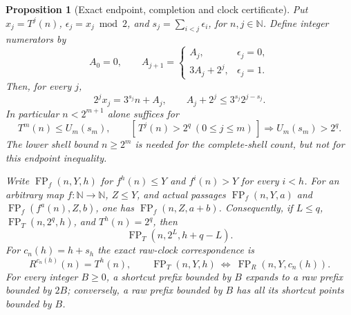 \documentclass[11pt]{article}
\newtheorem{proposition}{Proposition}
\theoremstyle{remark}\newtheorem{remark}[proposition]{Remark}
\newcommand{\NN}{\mathbb N}
\begin{document}
\begin{proposition}[Exact endpoint, completion and clock certificate]
\label{prop:shaik-core-certificate}
Put \(x_j=T^j(n)\), \(\epsilon_j=x_j\bmod2\), and
\(s_j=\sum_{i<j}\epsilon_i\), for \(n,j\in\NN\).
Define integer numerators by
\[
 A_0=0,\qquad
 A_{j+1}=
 \begin{cases}
 A_j,&\epsilon_j=0,\\
 3A_j+2^j,&\epsilon_j=1.
 \end{cases}
\]
Then, for every \(j\),
\begin{equation}\label{eq:shaik-core-affine}
 2^jx_j=3^{s_j}n+A_j,\qquad
 A_j+2^j\le3^{s_j}2^{j-s_j}.
\end{equation}
In particular \(n<2^{m+1}\) alone suffices for
\[
 T^m(n)\le U_m(s_m),\qquad
 [\,T^j(n)>2^q\ (0\le j\le m)\,]\Longrightarrow
 U_m(s_m)>2^q .
\]
The lower shell bound \(n\ge2^m\) is needed for the complete-shell
count, but not for this endpoint inequality.

Write \(\operatorname{FP}_f(n,Y,h)\) for
\(f^h(n)\le Y\) and \(f^i(n)>Y\) for every \(i<h\).
For an arbitrary map \(f:\NN\to\NN\), \(Z\le Y\), and actual passages
\(\operatorname{FP}_f(n,Y,a)\) and
\(\operatorname{FP}_f(f^a(n),Z,b)\), one has
\(\operatorname{FP}_f(n,Z,a+b)\).
Consequently, if \(L\le q\), \(\operatorname{FP}_T(n,2^q,h)\),
and \(T^h(n)=2^q\), then
\[
 \operatorname{FP}_T(n,2^L,h+q-L).
\]
For \(c_n(h)=h+s_h\) the exact raw-clock correspondence is
\[
 R^{c_n(h)}(n)=T^h(n),\qquad
 \operatorname{FP}_T(n,Y,h)
 \ \Longleftrightarrow\
 \operatorname{FP}_R(n,Y,c_n(h)).
\]
For every integer \(B\ge0\), a shortcut prefix bounded by \(B\)
expands to a raw prefix bounded by \(2B\); conversely, a raw prefix
bounded by \(B\) has all its shortcut points bounded by \(B\).
\end{proposition}
\end{document}
